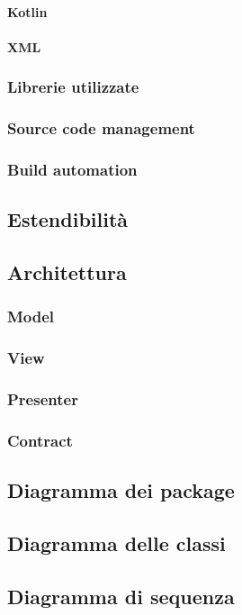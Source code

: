 \paragraph{Kotlin}

\paragraph{XML}

\subsubsection{Librerie utilizzate}

\subsubsection{Source code management}

\subsubsection{Build automation}


\subsection{Estendibilità}

\subsection{Architettura}



\subsubsection{Model}

\subsubsection{View}

\subsubsection{Presenter}

\subsubsection{Contract}


\subsection{Diagramma dei package}

\subsection{Diagramma delle classi}

\subsection{Diagramma di sequenza}
